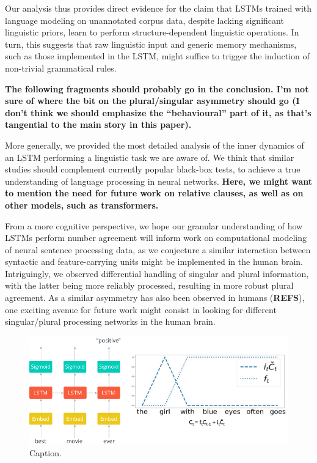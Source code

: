 Our analysis thus provides direct evidence for the claim that LSTMs
trained with language modeling on unannotated corpus data, despite
lacking significant linguistic priors, learn to perform
structure-dependent linguistic operations. In turn, this suggests that
raw linguistic input and generic memory mechanisms, such as those
implemented in the LSTM, might suffice to trigger the induction of
non-trivial grammatical rules.

\textbf{The following fragments should probably go in the
  conclusion. I'm not sure of where the bit on the plural/singular
  asymmetry should go (I don't think we should emphasize the
  ``behavioural'' part of it, as that's tangential to the main story in
  this paper).}

More generally, we provided the most detailed analysis of the inner
dynamics of an LSTM performing a linguistic task we are aware of. We
think that similar studies should complement currently popular
black-box tests, to achieve a true understanding of language
processing in neural networks. \textbf{Here, we might want to mention
  the need for future work on relative clauses, as well as on other
  models, such as transformers.}

From a more cognitive perspective, we hope our granular
understanding of how LSTMs perform number agreement will inform work
on computational modeling of neural sentence processing data, as we
conjecture a similar interaction between syntactic and
feature-carrying units might be implemented in the human
brain. Intriguingly, we observed differential handling of singular and
plural information, with the latter being more reliably processed,
resulting in more robust plural agreement. As a similar asymmetry has
also been observed in humans (\textbf{REFS}), one exciting avenue for
future work might consist in looking for different singular/plural
processing networks in the human brain.


\begin{figure}
\includegraphics[width=\linewidth]{Figures/Figure1_intro.png}
\caption{Caption.}
\end{figure}

